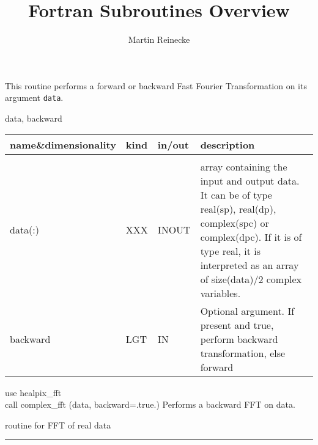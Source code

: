 \sloppy

\title{\healpix Fortran Subroutines Overview}
 \section[complex\_fft]{ }
\label{sub:complex_fft}
\author{Martin Reinecke}

\begin{facility}
{This routine performs a forward or backward Fast Fourier Transformation
on its argument {\tt data}.}
{\modHealpixFft}
\end{facility}

\begin{f90format}
{data, backward}
\end{f90format}

\begin{arguments}
{
\begin{tabular}{p{0.3\hsize} p{0.05\hsize} p{0.1\hsize} p{0.45\hsize}} \hline  
\textbf{name\&dimensionality} & \textbf{kind} & \textbf{in/out} & \textbf{description} \\ \hline
                   &   &   &                           \\ %
data(:) & XXX & INOUT &
  array containing the input and output data. It can be of type
  real(sp), real(dp), complex(spc) or complex(dpc). If it is of type real,
  it is interpreted as an array of size(data)/2 complex variables.  \\
backward & LGT & IN & Optional argument. If present and true, perform backward transformation, else forward \\
\end{tabular}}
\end{arguments}

\begin{example}
{
use healpix\_fft \\
call complex\_fft (data, backward=.true.)
}
{
Performs a backward FFT on data.
}
\end{example}

\begin{related}
  \begin{sulist}{} %
  \item[\htmlref{real\_fft}{sub:real_fft}] routine for FFT of real data
  \end{sulist}
\end{related}

\rule{\hsize}{2mm}

\newpage
